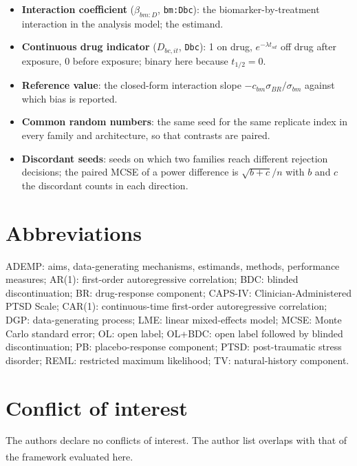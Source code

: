 \documentclass[
  11pt,
]{article}
\begin{document}
\begin{itemize}
  then blinded discontinuation at week 18 or week 19; two
  randomization paths; no crossover.
\item
  \textbf{Interaction coefficient} (\(\beta_{bm:D}\), \texttt{bm:Dbc}): the
  biomarker-by-treatment interaction in the analysis model; the
  estimand.
\item
  \textbf{Continuous drug indicator} (\(D_{bc,it}\), \texttt{Dbc}): 1 on drug,
  \(e^{-\lambda t_{sd}}\) off drug after exposure, 0 before exposure;
  binary here because \(t_{1/2} = 0\).
\item
  \textbf{Reference value}: the closed-form interaction slope
  \(-c_{bm}\sigma_{BR}/\sigma_{bm}\) against which bias is reported.
\item
  \textbf{Common random numbers}: the same seed for the same replicate
  index in every family and architecture, so that contrasts are paired.
\item
  \textbf{Discordant seeds}: seeds on which two families reach different
  rejection decisions; the paired MCSE of a power difference is
  \(\sqrt{b + c}/n\) with \(b\) and \(c\) the discordant counts in each
  direction.
\end{itemize}

\section*{Abbreviations}\label{abbreviations}

ADEMP: aims, data-generating mechanisms, estimands, methods,
performance measures; AR(1): first-order autoregressive correlation;
BDC: blinded discontinuation; BR: drug-response component; CAPS-IV:
Clinician-Administered PTSD Scale; CAR(1): continuous-time first-order
autoregressive correlation; DGP: data-generating process; LME: linear
mixed-effects model; MCSE: Monte Carlo standard error; OL: open label;
OL+BDC: open label followed by blinded discontinuation; PB:
placebo-response component; PTSD: post-traumatic stress disorder;
REML: restricted maximum likelihood; TV: natural-history component.

\section{Conflict of interest}\label{conflict-of-interest}

The authors declare no conflicts of interest. The author list
overlaps with that of the framework evaluated here\textsuperscript{}.
\end{document}
